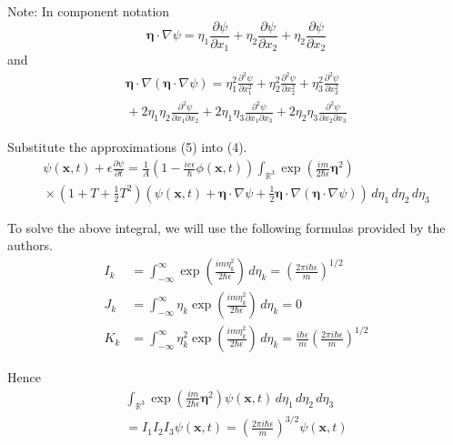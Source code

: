 \documentclass[12pt]{article}
\newcommand\INT{\int_{\mathbb R^3}}
\begin{document}
Note: In component notation
\begin{equation*}
\boldsymbol\eta\cdot\nabla\psi=
\eta_1\frac{\partial\psi}{\partial x_1}+
\eta_2\frac{\partial\psi}{\partial x_2}+
\eta_2\frac{\partial\psi}{\partial x_2}
\end{equation*}
and
\begin{multline*}
\boldsymbol\eta\cdot\nabla(\boldsymbol\eta\cdot\nabla\psi)=
\eta_1^2\frac{\partial^2\psi}{\partial x_1^2}
+\eta_2^2\frac{\partial^2\psi}{\partial x_2^2}
+\eta_3^2\frac{\partial^2\psi}{\partial x_3^2}
\\
{}+2\eta_1\eta_2\frac{\partial^2\psi}{\partial x_1\partial x_2}
+2\eta_1\eta_3\frac{\partial^2\psi}{\partial x_1\partial x_3}
+2\eta_2\eta_3\frac{\partial^2\psi}{\partial x_2\partial x_3}
\end{multline*}

Substitute the approximations (5) into (4).
\begin{multline*}
\psi(\mathbf x,t)+\epsilon\frac{\partial\psi}{\partial t}=
\frac{1}{A}
\left(1-\frac{ie\epsilon}{\hbar}\phi\left(\mathbf x,t\right)\right)
\INT\exp\left(\frac{im}{2\hbar\epsilon}\boldsymbol\eta^2\right)
\\
{}\times
\left(1+T+\tfrac{1}{2}T^2\right)
\left(\psi(\mathbf x,t)+\boldsymbol\eta\cdot\nabla\psi
+\tfrac{1}{2}\boldsymbol\eta\cdot\nabla(\boldsymbol\eta\cdot\nabla\psi)\right)
\,d\eta_1\,d\eta_2\,d\eta_3
\tag{6}
\end{multline*}

To solve the above integral, we will use the following formulas provided by the authors.
\begin{align*}
I_k&=\int_{-\infty}^\infty\exp\left(\frac{im\eta_k^2}{2\hbar\epsilon}\right)\,d\eta_k
=\left(\frac{2\pi i\hbar\epsilon}{m}\right)^{1/2}
\\
J_k&=\int_{-\infty}^\infty\eta_k\exp\left(\frac{im\eta_k^2}{2\hbar\epsilon}\right)\,d\eta_k
=0
\\
K_k&=\int_{-\infty}^\infty\eta_k^2\exp\left(\frac{im\eta_k^2}{2\hbar\epsilon}\right)\,d\eta_k
=\frac{i\hbar\epsilon}{m}\left(\frac{2\pi i\hbar\epsilon}{m}\right)^{1/2}
\end{align*}

Hence
\begin{multline*}
\INT\exp\left(\frac{im}{2\hbar\epsilon}\boldsymbol\eta^2\right)\psi(\mathbf x,t)
\,d\eta_1\,d\eta_2\,d\eta_3
\\
{}=I_1 I_2 I_3 \psi(\mathbf x,t)
=\left(\frac{2\pi i\hbar\epsilon}{m}\right)^{3/2}\psi(\mathbf x,t)
\end{multline*}
\end{document}
